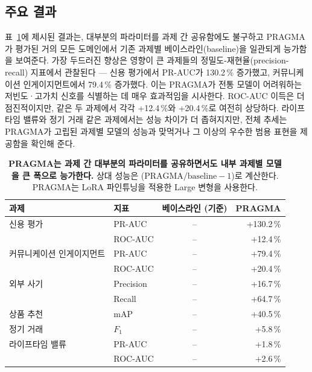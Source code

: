 \subsection{주요 결과}
\label{sec:results}


표~\ref{tab:main_results}에 제시된 결과는, 대부분의 파라미터를 과제 간 공유함에도 불구하고 PRAGMA가 평가된 거의 모든 도메인에서 기존 과제별 베이스라인(baseline)을 일관되게 능가함을 보여준다.
가장 두드러진 향상은 영향이 큰 과제들의 정밀도-재현율(precision-recall) 지표에서 관찰된다 — 신용 평가에서 PR-AUC가 130.2\,\% 증가했고, 커뮤니케이션 인게이지먼트에서 79.4\,\% 증가했다. 이는 PRAGMA가 전통 모델이 어려워하는 저빈도·고가치 신호를 식별하는 데 매우 효과적임을 시사한다.
ROC-AUC 이득은 더 점진적이지만, 같은 두 과제에서 각각 +12.4\,\%와 +20.4\,\%로 여전히 상당하다.
라이프타임 밸류와 정기 거래 같은 과제에서는 성능 차이가 더 좁혀지지만, 전체 추세는 PRAGMA가 고립된 과제별 모델의 성능과 맞먹거나 그 이상의 우수한 범용 표현을 제공함을 확인해 준다.

\begin{table}[t]
\centering
\begin{tabular}{llcr}
\textbf{과제}             & \textbf{지표}   & \textbf{베이스라인 (기준)} & \textbf{PRAGMA} \\
\midrule
신용 평가            & PR-AUC            & --                    & +130.2\,\%                \\
                          & ROC-AUC           & --                    &  +12.4\,\%                \\
\addlinespace
커뮤니케이션 인게이지먼트 & PR-AUC            & --                    &  +79.4\,\%                \\
                          & ROC-AUC           & --                    &  +20.4\,\%                \\
\addlinespace
외부 사기            & Precision         & --                    &  +16.7\,\%                \\
                          & Recall            & --                    &  +64.7\,\%                \\
\addlinespace
상품 추천    & mAP               & --                    &  +40.5\,\%                \\
\addlinespace
정기 거래    & $F_\text{1}$      & --                    &   +5.8\,\%                \\
\addlinespace
라이프타임 밸류            & PR-AUC            & --                    &   +1.8\,\%                \\
                          & ROC-AUC           & --                    &   +2.6\,\%                \\
\end{tabular}
\caption{
    \textbf{PRAGMA는 과제 간 대부분의 파라미터를 공유하면서도 내부 과제별 모델을 큰 폭으로 능가한다.}
    상대 성능은 ($\text{PRAGMA} / \text{baseline} - 1$)로 계산한다.
    PRAGMA는 LoRA 파인튜닝을 적용한 Large 변형을 사용한다.}
    \label{tab:main_results}
\end{table}


